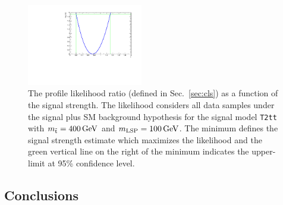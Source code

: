 \begin{figure}[h!]
  \begin{center}
      \includegraphics[width=0.45\textwidth]{figures/fit/v22/wSignal/400_100/intervalPlot_2012pf_RQcdZero_fZinvAll_1b_ge4j-1hp_2b_ge4j-1h_signal_95}
    \caption{\label{fig:t2tt-int-400_100}The profile likelihood ratio 
      (defined in Sec.~\ref{sec:cls}) as a function of the signal strength.
      The likelihood considers all data samples under the signal plus SM 
      background hypothesis for the signal model \texttt{T2tt} with 
      $m_{\tilde{\rm t}} = 400\,\text{Ge\hspace{-.08em}V}$ and $m_{\text{LSP}} = 100\,\text{Ge\hspace{-.08em}V}$.
      The minimum defines the signal strength estimate which maximizes the
      likelihood and the green vertical line on the right of the minimum 
      indicates the upper-limit at 95\% confidence level.}
  \end{center}
\end{figure}
\FloatBarrier

\subsection{Conclusions}

